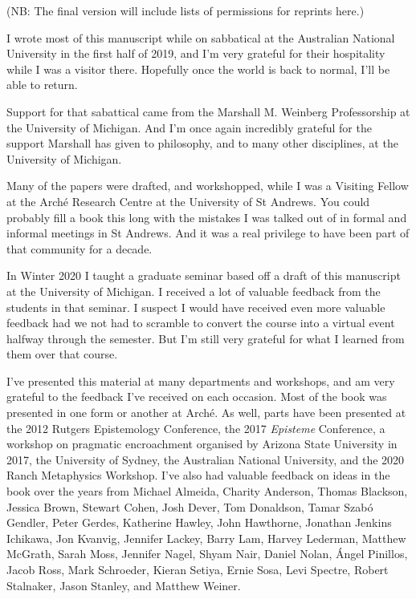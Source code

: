 \documentclass[
  11pt,
]{book}
\begin{document}
(NB: The final version will include lists of permissions for reprints here.)

I wrote most of this manuscript while on sabbatical at the Australian National University in the first half of 2019, and I'm very grateful for their hospitality while I was a visitor there. Hopefully once the world is back to normal, I'll be able to return.

Support for that sabattical came from the Marshall M. Weinberg Professorship at the University of Michigan. And I'm once again incredibly grateful for the support Marshall has given to philosophy, and to many other disciplines, at the University of Michigan.

Many of the papers were drafted, and workshopped, while I was a Visiting Fellow at the Arché Research Centre at the University of St Andrews. You could probably fill a book this long with the mistakes I was talked out of in formal and informal meetings in St Andrews. And it was a real privilege to have been part of that community for a decade.

In Winter 2020 I taught a graduate seminar based off a draft of this manuscript at the University of Michigan. I received a lot of valuable feedback from the students in that seminar. I suspect I would have received even more valuable feedback had we not had to scramble to convert the course into a virtual event halfway through the semester. But I'm still very grateful for what I learned from them over that course.

I've presented this material at many departments and workshops, and am very grateful to the feedback I've received on each occasion. Most of the book was presented in one form or another at Arché. As well, parts have been presented at the 2012 Rutgers Epistemology Conference, the 2017 \emph{Episteme} Conference, a workshop on pragmatic encroachment organised by Arizona State University in 2017, the University of Sydney, the Australian National University, and the 2020 Ranch Metaphysics Workshop. I've also had valuable feedback on ideas in the book over the years from Michael Almeida, Charity Anderson, Thomas Blackson, Jessica Brown, Stewart Cohen, Josh Dever, Tom Donaldson, Tamar Szabó Gendler, Peter Gerdes, Katherine Hawley, John Hawthorne, Jonathan Jenkins Ichikawa, Jon Kvanvig, Jennifer Lackey, Barry Lam, Harvey Lederman, Matthew McGrath, Sarah Moss, Jennifer Nagel, Shyam Nair, Daniel Nolan, Ángel Pinillos, Jacob Ross, Mark Schroeder, Kieran Setiya, Ernie Sosa, Levi Spectre, Robert Stalnaker, Jason Stanley, and Matthew Weiner.
\end{document}

